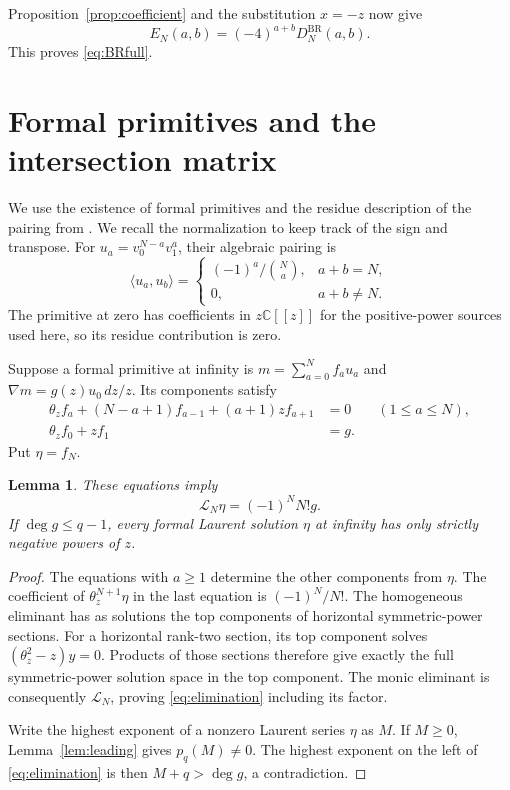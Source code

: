 \documentclass[11pt]{article}
\newtheorem{lemma}[theorem]{Lemma}
\theoremstyle{definition}
\newcommand{\C}{\mathbb C}
\newcommand{\BR}{\mathrm{BR}}
\numberwithin{equation}{section}
\begin{document}
Proposition~\ref{prop:coefficient} and the substitution $x=-z$ now give
\begin{equation}\label{eq:ED}
 E_N(a,b)=(-4)^{a+b}D_N^{\BR}(a,b).
\end{equation}
This proves \eqref{eq:BRfull}.

\section{Formal primitives and the intersection matrix}

We use the existence of formal primitives and the residue description
of the pairing from \cite[Lemma 3.3, Proposition 3.8 and Section 3.b]{FSY}.
We recall the normalization to keep track of the sign and transpose.
For $u_a=v_0^{N-a}v_1^a$, their algebraic pairing is
\begin{equation}\label{eq:algebraicpairing}
 \langle u_a,u_b\rangle=
 \begin{cases}(-1)^a/\binom Na,&a+b=N,\\0,&a+b\ne N.
 \end{cases}
\end{equation}
The primitive at zero has coefficients in $z\C[[z]]$ for the
positive-power sources used here, so its residue contribution is zero.

Suppose a formal primitive at infinity is
$m=\sum_{a=0}^Nf_au_a$ and
$\nabla m=g(z)u_0\,dz/z$. Its components satisfy
\begin{align}\label{eq:components}
 \theta_zf_a+(N-a+1)f_{a-1}+(a+1)zf_{a+1}&=0
                      &&(1\le a\le N),\\
 \theta_zf_0+zf_1&=g.\nonumber
\end{align}
Put $\eta=f_N$.

\begin{lemma}\label{lem:primitive}
These equations imply
\begin{equation}\label{eq:elimination}
 \mathcal L_N\eta=(-1)^NN!g.
\end{equation}
If $\deg g\le q-1$, every formal Laurent solution $\eta$ at infinity
has only strictly negative powers of $z$.
\end{lemma}
\begin{proof}
The equations with $a\ge1$ determine the other components from $\eta$.
The coefficient of $\theta_z^{N+1}\eta$ in the last equation is
$(-1)^N/N!$. The homogeneous eliminant has as solutions the top
components of horizontal symmetric-power sections.
For a horizontal rank-two section, its top component solves
$(\theta_z^2-z)y=0$. Products of those sections therefore give exactly
the full symmetric-power solution space in the top component.
The monic eliminant is consequently $\mathcal L_N$, proving
\eqref{eq:elimination} including its factor.

Write the highest exponent of a nonzero Laurent series $\eta$ as $M$.
If $M\ge0$, Lemma~\ref{lem:leading} gives $p_q(M)\ne0$.
The highest exponent on the left of \eqref{eq:elimination} is then
$M+q>\deg g$, a contradiction.
\end{proof}
\end{document}
